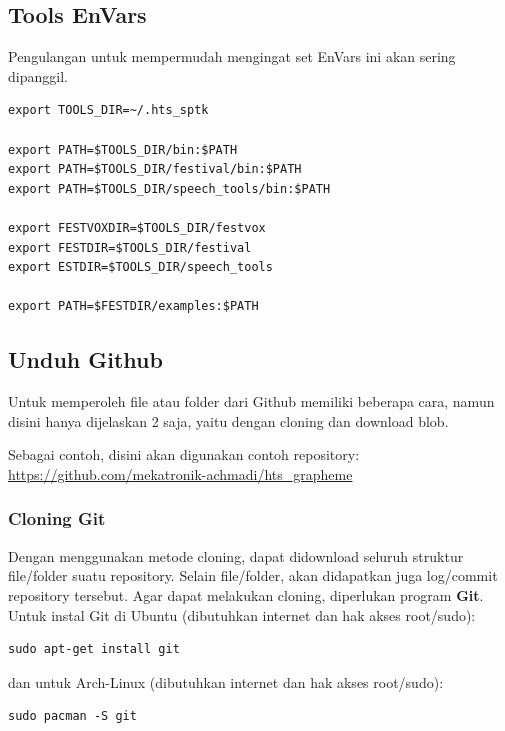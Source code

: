 \documentclass[12pt,]{article}
\begin{document}
	\newpage
	\subsection{Tools EnVars}
	
	Pengulangan untuk mempermudah mengingat set EnVars ini akan sering dipanggil.
	
	\begin{verbatim}
export TOOLS_DIR=~/.hts_sptk

export PATH=$TOOLS_DIR/bin:$PATH
export PATH=$TOOLS_DIR/festival/bin:$PATH
export PATH=$TOOLS_DIR/speech_tools/bin:$PATH

export FESTVOXDIR=$TOOLS_DIR/festvox
export FESTDIR=$TOOLS_DIR/festival
export ESTDIR=$TOOLS_DIR/speech_tools

export PATH=$FESTDIR/examples:$PATH
	\end{verbatim}
	
	\subsection{Unduh Github}
	
	Untuk memperoleh file atau folder dari Github memiliki beberapa cara,
	namun disini hanya dijelaskan 2 saja, 
	yaitu dengan cloning dan download blob.
	
	Sebagai contoh, disini akan digunakan contoh repository:\\
	\url{https://github.com/mekatronik-achmadi/hts_grapheme}
	
	\subsubsection{Cloning Git}
	
	Dengan menggunakan metode cloning, dapat didownload seluruh struktur file/folder suatu repository.
	Selain file/folder, akan didapatkan juga log/commit repository tersebut. 
	Agar dapat melakukan cloning, diperlukan program \textbf{Git}.
	Untuk instal Git di Ubuntu (dibutuhkan internet dan hak akses root/sudo):
	\begin{verbatim}
sudo apt-get install git
	\end{verbatim}
	
	dan untuk Arch-Linux (dibutuhkan internet dan hak akses root/sudo):
	\begin{verbatim}
sudo pacman -S git
	\end{verbatim}
	
\end{document}
